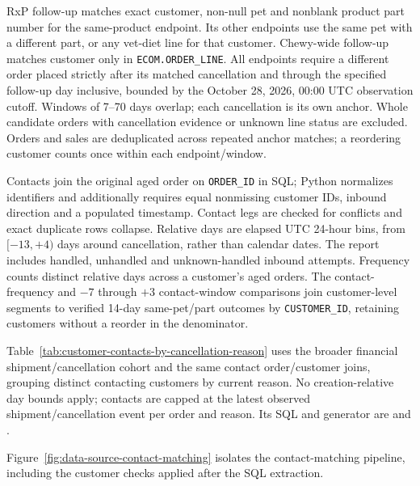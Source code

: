 RxP follow-up matches exact customer, non-null pet and nonblank product part
number for the same-product endpoint. Its other endpoints use the same pet with
a different part, or any vet-diet line for that customer. Chewy-wide follow-up
matches customer only in \texttt{ECOM.ORDER\_LINE}. All endpoints require a
different order placed strictly after its matched cancellation and through
the specified follow-up day inclusive, bounded by the October 28, 2026,
00:00 UTC observation cutoff. Windows of 7--70 days overlap; each cancellation
is its own anchor. Whole candidate orders with cancellation evidence or unknown
line status are excluded. Orders and sales are deduplicated across repeated
anchor matches; a reordering customer counts once within each endpoint/window.

Contacts join the original aged order on \texttt{ORDER\_ID} in SQL; Python
normalizes identifiers and additionally requires equal nonmissing customer IDs,
inbound direction and a populated timestamp. Contact legs are checked for
conflicts and exact duplicate rows collapse. Relative days are elapsed UTC
24-hour bins, from $[-13,+4)$ days around cancellation, rather than calendar
dates. The report includes handled, unhandled and unknown-handled inbound
attempts. Frequency counts distinct relative days across a customer's aged
orders. The contact-frequency and $-7$ through $+3$ contact-window comparisons
join customer-level segments to verified 14-day same-pet/part outcomes by
\texttt{CUSTOMER\_ID}, retaining customers without a reorder in the denominator.

Table~\ref{tab:customer-contacts-by-cancellation-reason} uses the broader financial
shipment/cancellation cohort and the same contact order/customer joins, grouping
distinct contacting customers by current reason. No creation-relative day bounds
apply; contacts are capped at the latest observed shipment/cancellation
event per order and reason. Its SQL and generator are
 and
.

Figure~\ref{fig:data-source-contact-matching} isolates the contact-matching
pipeline, including the customer checks applied after the SQL extraction.





